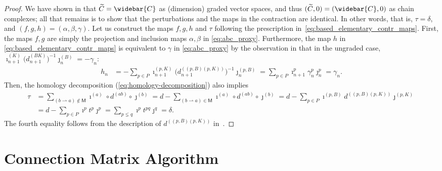 \documentclass[11pt, table, nothms]{amsart}
\theoremstyle{definition}
\newcommand{\sM}{\mathsf{M}}
\newcommand{\oC}{\widebar{C}}
\begin{document}
{\begin{proof}
 We have shown in  that $\widetilde{C} = \oC$ as (dimension) graded vector spaces, and thus $(\widetilde{C},0) = (\oC,0)$  as chain complexes; all that remains is to show that the perturbations and the maps in the contraction are identical. In other words, that is, $\tau = \delta$, and  $(f,g,h) = (\alpha, \beta, \gamma)$.  Let us construct the maps $f,g,h$ and $\tau$ following the prescription in~\cref{eq:based_elementary_contr_maps}. First, the maps $f,g$ are simply the projection and inclusion maps $\alpha, \beta$ in \cref{eq:abc_proxy}. Furthermore, the map $h$ in \cref{eq:based_elementary_contr_maps} is equivalent to $\gamma$ in \cref{eq:abc_proxy} by the observation in  that in the ungraded case, $\imath^{(K)}_{n+1} \big(d^{(BK)}_{n+1} \big)^{-1}\jmath^{(B)}_n = -\gamma_n$:
\begin{align*}
    h_n &= - \sum_{p \in P} \imath^{(p,K)}_{n+1} \big(d^{((p,B) (p,K))}_{n+1} \big)^{-1}\jmath^{(p,B)}_n = \sum_{p \in P} \imath^p_{n+1} \gamma^p_n  \jmath^p_n = \gamma_n.
\end{align*}
Then, the homology decomposition (\cref{eq:homology-decomposition}) also implies 
\begin{align*}
    \tau &= \sum_{(b\rightharpoonup a) \notin \sM}\imath^{(a)} \circ d^{(ab)} 
    \circ \jmath^{(b)}  = d - \sum_{(b\rightharpoonup a) \in \sM}\imath^{(a)} \circ d^{(ab)} 
    \circ \jmath^{(b)} = d- \sum_{p \in P } \imath^{(p,B)} d^{((p,B) (p,K))} \jmath^{(p,K)} \\
    &= d - \sum_{p \in P}\imath^p t^p \jmath^p = \sum_{p \lneq q}\imath^p t^{pq} \jmath^q = \delta. 
\end{align*}
The fourth equality follows from the description of $d^{((p,B) (p,K))}$ in~.
\end{proof}


\label{subsec:contraction-via-perturbation}
\section{Connection Matrix Algorithm}\label{sec:connection-matrix-algorithm}

}
\end{document}
